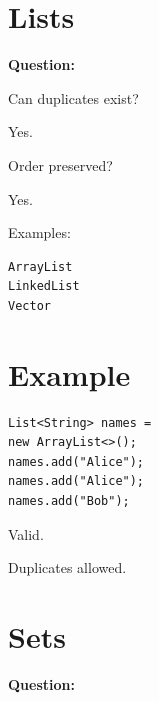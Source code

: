 \documentclass[11pt,a4paper]{book}
\begin{document}

\section{Lists}

\textbf{Question:}


Can duplicates exist?


Yes.


Order preserved?


Yes.


Examples:

\begin{verbatim}
ArrayList
LinkedList
Vector
\end{verbatim}


\section{Example}

\begin{verbatim} 
List<String> names =
new ArrayList<>();
names.add("Alice");
names.add("Alice");
names.add("Bob");
\end{verbatim}


Valid.


Duplicates allowed.


\section{Sets}

\textbf{Question:}

\end{document}
